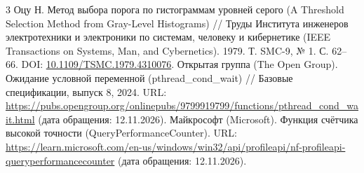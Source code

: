 \begin{thebibliography}{3}
 Оцу Н. Метод выбора порога по гистограммам уровней серого (A Threshold Selection Method from Gray-Level Histograms) // Труды Института инженеров электротехники и электроники по системам, человеку и кибернетике (IEEE Transactions on Systems, Man, and Cybernetics). 1979. Т. SMC-9, № 1. С. 62--66. DOI: \href{https://doi.org/10.1109/TSMC.1979.4310076}{10.1109/TSMC.1979.4310076}.
 Открытая группа (The Open Group). Ожидание условной переменной (pthread\_cond\_wait) // Базовые спецификации, выпуск 8, 2024. URL: \url{https://pubs.opengroup.org/onlinepubs/9799919799/functions/pthread_cond_wait.html} (дата обращения: 12.11.2026).
 Майкрософт (Microsoft). Функция счётчика высокой точности (QueryPerformanceCounter). URL: \url{https://learn.microsoft.com/en-us/windows/win32/api/profileapi/nf-profileapi-queryperformancecounter} (дата обращения: 12.11.2026).
\end{thebibliography}


